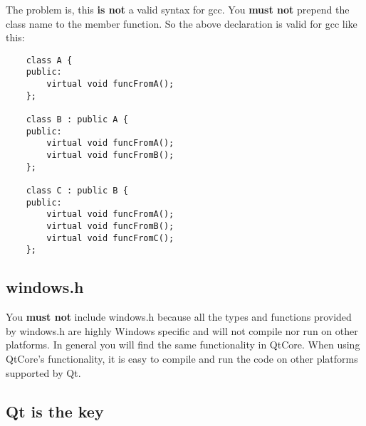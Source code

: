 The problem is, this \textbf{is not} a valid syntax for gcc. You \textbf{must not} prepend the class name to the member function. So the above declaration is valid for gcc like this:
\begin{verbatim}
    class A {
    public:
        virtual void funcFromA();
    };
    
    class B : public A {
    public:
        virtual void funcFromA();
        virtual void funcFromB();
    };
    
    class C : public B {
    public:
        virtual void funcFromA();
        virtual void funcFromB();
        virtual void funcFromC();
    };
\end{verbatim}

\subsection{windows.h} You \textbf{must not} include windows.h because all the types and functions provided by windows.h are highly Windows specific and will not compile nor run on other platforms. In general you will find the same functionality in QtCore. When using QtCore's functionality, it is easy to compile and run the code on other platforms supported by Qt.

\subsection{Qt is the key} 


